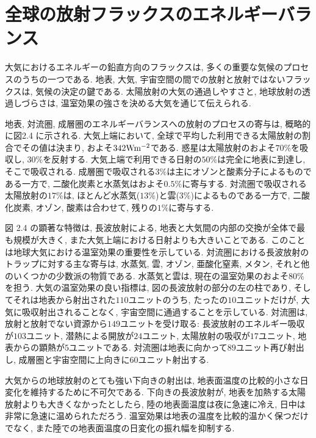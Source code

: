 \documentclass[a4j,12pt,openbib,oneside,dvipdfmx]{jbook}
\begin{document}
\newpage
{}
\section{全球の放射フラックスのエネルギーバランス}
大気におけるエネルギーの鉛直方向のフラックスは, 多くの重要な気候のプロセスのうちの一つである. 地表, 大気, 宇宙空間の間での放射と放射ではないフラックスは, 気候の決定の鍵である. 太陽放射の大気の通過しやすさと, 地球放射の透過しづらさは, 温室効果の強さを決める大気を通じて伝えられる.
\par
地表, 対流圏, 成層圏のエネルギーバランスへの放射のプロセスの寄与は, 概略的に図2.4 に示される. 大気上端において, 全球で平均した利用できる太陽放射の割合でその値は決まり, およそ$342 \rm{W}\rm{m}^{-2}$である. 
惑星は太陽放射のおよそ$70\%$を吸収し, $30\%$を反射する. 大気上端で利用できる日射の$50\%$は完全に地表に到達し, そこで吸収される. 成層圏で吸収される$3\%$は主にオゾンと酸素分子によるものである一方で, 二酸化炭素と水蒸気はおよそ$0.5\%$に寄与する. 
対流圏で吸収される太陽放射の$17\%$は, ほとんど水蒸気($13\%$)と雲($3\%$)によるものである一方で, 二酸化炭素, オゾン, 酸素は合わせて, 残りの$1\%$に寄与する. 
\par
図 2.4 の顕著な特徴は, 長波放射による, 地表と大気間の内部の交換が全体で最も規模が大きく, また大気上端における日射よりも大きいことである. 
このことは地球大気における温室効果の重要性を示している. 対流圏における長波放射のトラップに対する主な寄与は, 水蒸気, 雲, オゾン, 亜酸化窒素, メタン, それと他のいくつかの少数派の物質である. 水蒸気と雲は, 現在の温室効果のおよそ$80\%$を担う. 
大気の温室効果の良い指標は, 図の長波放射の部分の左の柱であり, そしてそれは地表から射出された$110$ユニットのうち, たったの$10$ユニットだけが, 大気に吸収射出されることなく, 宇宙空間に通過することを示している. 
対流圏は, 放射と放射でない資源から$149$ユニットを受け取る: 長波放射のエネルギー吸収が$103$ユニット, 潜熱による開放が$24$ユニット, 太陽放射の吸収が$17$ユニット, 地表からの顕熱が$5$ユニットである. 
対流圏は地表に向かって$89$ユニット再び射出し, 成層圏と宇宙空間に上向きに$60$ユニット射出する.
\par
大気からの地球放射のとても強い下向きの射出は, 地表面温度の比較的小さな日変化を維持するために不可欠である. 下向きの長波放射が, 地表を加熱する太陽放射よりも大きくなかったとしたら, 陸の地表面温度は夜に急速に冷え, 日中は非常に急速に温められただろう. 温室効果は地表の温度を比較的温かく保つだけでなく, また陸での地表面温度の日変化の振れ幅を抑制する.
\end{document}
